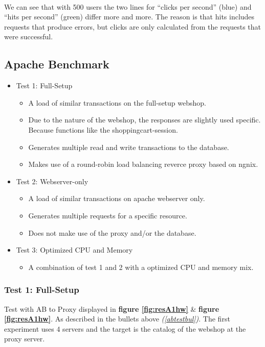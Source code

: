 \paragraph{}
We can see that with 500 users the two lines for “clicks per second” (blue) and “hits per second” (green) differ more and more. The reason is that hits includes requests that produce errors, but clicks are only calculated from the requests that were successful.

\subsection{Apache Benchmark}

\begin{itemize}
    \label{abtestbul}
    \item Test 1: Full-Setup
    \begin{itemize}
        \item A load of similar transactions on the full-setup webshop.
        \item Due to the nature of the webshop, the responses are slightly used specific. Because functions like the shoppingcart-session.
        \item Generates multiple read and write transactions to the database.
        \item Makes use of a round-robin load balancing reverce proxy based on ngnix.  
    \end{itemize}
    \item Test 2: Webserver-only
    \begin{itemize}
        \item A load of similar transactions on apache webserver only.
        \item Generates multiple requests for a specific resource.
        \item Does not make use of the proxy and/or the database.
    \end{itemize}
    \item Test 3: Optimized CPU and Memory
    \begin{itemize}
        \item A combination of test 1 and 2 with a optimized CPU and memory mix.
    \end{itemize}
\end{itemize}

\subsubsection{Test 1: Full-Setup}
Test with AB to Proxy displayed in \textbf{figure \ref{fig:resA1hw}} \& \textbf{figure \ref{fig:resA1hw}}. As described in the bullets above \textit{(\ref{abtestbul})}.
The first experiment uses 4 servers and the target is the catalog of the webshop at the proxy server.

